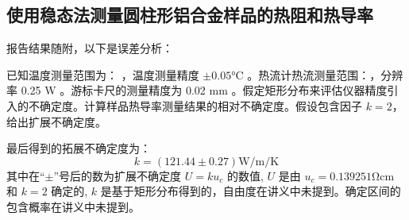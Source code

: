\documentclass[a4paper,utf8]{article}
\newcommand{\TTR}[0]{\watt\per\m\per\K}
\begin{document}
    \subsection{使用稳态法测量圆柱形铝合金样品的热阻和热导率}
        报告结果随附，以下是误差分析：\par
        已知温度测量范围为： ，温度测量精度 $\pm 0.05 \unit{\degreeCelsius}$ 。热流计热流测量范围：\linebreak {}，分辨率 0.25 \unit{\watt} 。游标卡尺的测量精度为 0.02 \unit{\mm} 。假定矩形分布来评估仪器精度引入的不确定度。计算样品热导率测量结果的相对不确定度。假设包含因子 $k=2$，给出扩展不确定度。
        \begin{figure}[!ht]
            \par
        \end{figure}\par
        最后得到的拓展不确定度为：
        \begin{equation*}
            k = ( 121.44 \pm 0.27 ) \unit{\TTR}
        \end{equation*}
        其中在“$\pm$”号后的数为扩展不确定度 $U=ku_c$ 的数值, $ U $ 是由 $ u_c= 0.139251 \unit{\ohm\cm}$ 和 $ k = 2 $ 确定的, $k$ 是基于矩形分布得到的，自由度在讲义中未提到。确定区间的包含概率在讲义中未提到。\newpage
\end{document}
